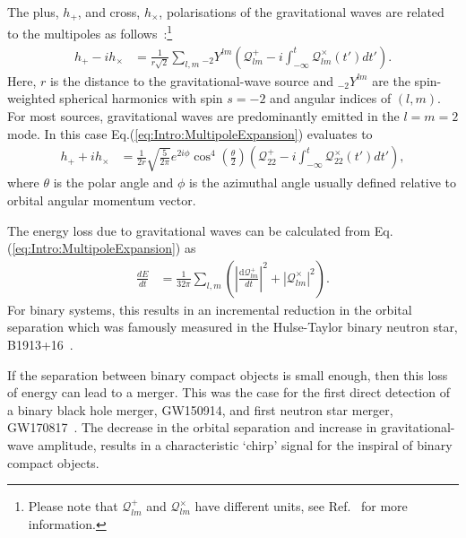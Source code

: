 \documentclass[../Thesis.tex]{subfiles}
\begin{document}
    The plus, $h_{+}$, and cross, $h_{\times}$, polarisations of the gravitational waves are related to the multipoles as follows~\cite{Moncrief1974,Abrahams1996,Andrade1999,Nagar2005,Baiotti2008}:\footnote{Please note that $\mathcal{Q}^+_{lm}$ and $\mathcal{Q}^\times_{lm}$ have different units, see Ref.~\cite{Nagar2005} for more information.}
     \begin{align}
        h_{+} - i h_{\times} & = \frac{1}{r\sqrt{2}}\sum_{l,m} {}_{-2}Y^{lm}\left(\mathcal{Q}^{+}_{lm} -i \int_{-\infty}^t\mathcal{Q}^\times_{lm}(t')dt'\right). \label{eq:Intro:MultipoleExpansion}
    \end{align}   
    Here, $r$ is the distance to the gravitational-wave source and ${}_{-2}Y^{lm}$ are the spin-weighted spherical harmonics with spin $s=-2$ and angular indices of $(l,m)$.
    For most sources, gravitational waves are predominantly emitted in the $l=m=2$ mode. 
    In this case Eq.(\ref{eq:Intro:MultipoleExpansion}) evaluates to
     \begin{align}
        h_{+} + i h_{\times} & = \frac{1}{2 r} \sqrt{\frac{5}{2\pi }} e^{2 i \phi } \cos ^4\left(\frac{\theta }{2}\right)\left(\mathcal{Q}^{+}_{22} -i \int_{-\infty}^t\mathcal{Q}^\times_{22}(t')dt'\right), \label{eq:Intro:MultipoleExpansionlm22}
    \end{align}
    where  $\theta$ is the polar angle and $\phi$ is the azimuthal angle usually defined relative to orbital angular momentum vector. \par
    
    The energy loss due to gravitational waves can be calculated from Eq.(\ref{eq:Intro:MultipoleExpansion}) as~\cite{Nagar2005}
     \begin{align}
        \frac{dE}{dt} & = \frac{1}{32 \pi}\sum_{l,m} \left(\left|\frac{\mathrm{d} \mathcal{Q}^{+}_{lm}}{dt}\right|^2 + \left|\mathcal{Q}^\times_{lm}\right|^2\right). \label{eq:Intro:EnergyLoss}
    \end{align}
    For binary systems, this results in an incremental reduction in the orbital separation which was famously measured in the Hulse-Taylor binary neutron star, B1913+16~\cite{Hulse1975,Taylor1982,Weisberg2016}. \par 
    
    If the separation between binary compact objects is small enough, then this loss of energy can lead to a merger.
    This was the case for the first direct detection of a binary black hole merger, GW150914, and first neutron star merger, GW170817~\cite{GW150914Detection,GW170817Detection}. 
    The decrease in the orbital separation and increase in gravitational-wave amplitude, results in a characteristic `chirp' signal for the inspiral of binary compact objects.
    
\end{document}
